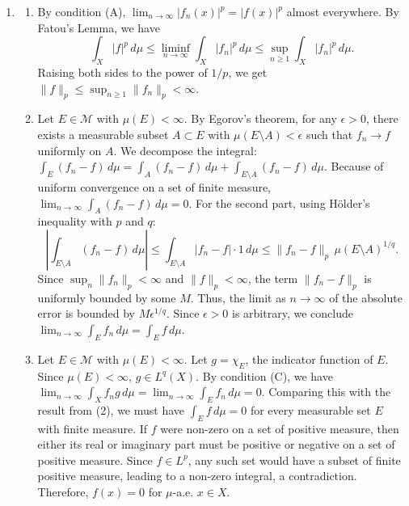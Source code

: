 \documentclass{article}
\begin{document}
\begin{enumerate}[label=\fbox{\arabic*}]
  \item %
        \begin{enumerate}[label=(\arabic*)]
          \item By condition (A), $\lim_{n\to\infty} |f_n(x)|^p = |f(x)|^p$ almost everywhere.
                By Fatou's Lemma, we have
                \[
                  \int_X |f|^p \, d\mu \le \liminf_{n\to\infty} \int_X |f_n|^p \, d\mu \le \sup_{n \ge 1} \int_X |f_n|^p \, d\mu.
                \]
                Raising both sides to the power of $1/p$, we get $\|f\|_p \le \sup_{n \ge 1} \|f_n\|_p < \infty$.
          \item Let $E \in \mathcal{M}$ with $\mu(E) < \infty$. By Egorov's theorem, for any $\epsilon > 0$, there exists a measurable subset $A \subset E$ with $\mu(E \setminus A) < \epsilon$ such that $f_n \to f$ uniformly on $A$.
                We decompose the integral: $\int_E (f_n - f) \, d\mu = \int_A (f_n - f) \, d\mu + \int_{E \setminus A} (f_n - f) \, d\mu$.
                Because of uniform convergence on a set of finite measure, $\lim_{n\to\infty} \int_A (f_n - f) \, d\mu = 0$.
                For the second part, using Hölder's inequality with $p$ and $q$:
                \[
                  \left| \int_{E \setminus A} (f_n - f) \, d\mu \right| \le \int_{E \setminus A} |f_n - f| \cdot 1 \, d\mu \le \|f_n - f\|_p \, \mu(E \setminus A)^{1/q}.
                \]
                Since $\sup_n \|f_n\|_p < \infty$ and $\|f\|_p < \infty$, the term $\|f_n - f\|_p$ is uniformly bounded by some $M$.
                Thus, the limit as $n \to \infty$ of the absolute error is bounded by $M \epsilon^{1/q}$. Since $\epsilon > 0$ is arbitrary, we conclude $\lim_{n\to\infty} \int_E f_n \, d\mu = \int_E f \, d\mu$.
          \item Let $E \in \mathcal{M}$ with $\mu(E) < \infty$. Let $g = \chi_E$, the indicator function of $E$. Since $\mu(E) < \infty$, $g \in L^q(X)$.
                By condition (C), we have $\lim_{n\to\infty} \int_X f_n g \, d\mu = \lim_{n\to\infty} \int_E f_n \, d\mu = 0$.
                Comparing this with the result from (2), we must have $\int_E f \, d\mu = 0$ for every measurable set $E$ with finite measure.
                If $f$ were non-zero on a set of positive measure, then either its real or imaginary part must be positive or negative on a set of positive measure. Since $f \in L^p$, any such set would have a subset of finite positive measure, leading to a non-zero integral, a contradiction. Therefore, $f(x) = 0$ for $\mu$-a.e. $x \in X$.
        \end{enumerate}


\end{enumerate}
\end{document}
